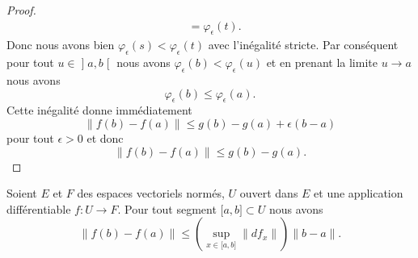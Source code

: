 \begin{proof}
\begin{subequations}
\begin{align}
					                      & =\varphi_{\epsilon}(t).
				\end{align}
			\end{subequations}
			Donc nous avons bien \( \varphi_{\epsilon}(s)<\varphi_{\epsilon}(t)\) avec l'inégalité stricte. Par conséquent pour tout \( u\in\mathopen] a , b \mathclose[\) nous avons \( \varphi_{\epsilon}(b)<\varphi_{\epsilon}(u)\) et en prenant la limite \( u\to a\) nous avons
	\begin{equation}
		\varphi_{\epsilon}(b)\leq \varphi_{\epsilon}(a).
	\end{equation}
	Cette inégalité donne immédiatement
	\begin{equation}
		\| f(b)-f(a) \|\leq g(b)-g(a)+\epsilon(b-a)
	\end{equation}
	pour tout \( \epsilon>0\) et donc
	\begin{equation}
		\| f(b)-f(a) \|\leq g(b)-g(a).
	\end{equation}
\end{proof}

\begin{theorem}\label{ThoNAKKght}
	Soient \( E\) et \( F\) des espaces vectoriels normés, \( U \) ouvert dans \( E\) et une application différentiable \( f\colon U\to F\). Pour tout segment \( \mathopen[ a , b \mathclose]\subset U\) nous avons
	\begin{equation}
		\| f(b)-f(a) \|\leq\left( \sup_{x\in\mathopen[ a , b \mathclose]}\| df_x \| \right)\| b-a \|.
	\end{equation}
\end{theorem}


